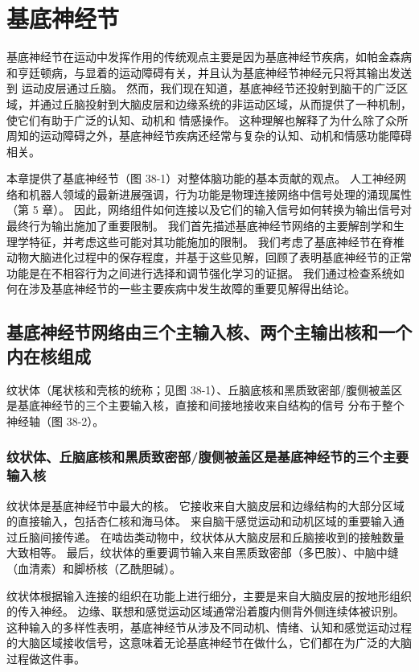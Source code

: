 \chapter{基底神经节} \label{chap:chap38}

基底神经节在运动中发挥作用的传统观点主要是因为基底神经节疾病，如帕金森病和亨廷顿病，与显着的运动障碍有关，并且认为基底神经节神经元只将其输出发送到 运动皮层通过丘脑。 然而，我们现在知道，基底神经节还投射到脑干的广泛区域，并通过丘脑投射到大脑皮层和边缘系统的非运动区域，从而提供了一种机制，使它们有助于广泛的认知、动机和 情感操作。 这种理解也解释了为什么除了众所周知的运动障碍之外，基底神经节疾病还经常与复杂的认知、动机和情感功能障碍相关。

本章提供了基底神经节（图 38-1）对整体脑功能的基本贡献的观点。 人工神经网络和机器人领域的最新进展强调，行为功能是物理连接网络中信号处理的涌现属性（第 5 章）。 因此，网络组件如何连接以及它们的输入信号如何转换为输出信号对最终行为输出施加了重要限制。 我们首先描述基底神经节网络的主要解剖学和生理学特征，并考虑这些可能对其功能施加的限制。 我们考虑了基底神经节在脊椎动物大脑进化过程中的保存程度，并基于这些见解，回顾了表明基底神经节的正常功能是在不相容行为之间进行选择和调节强化学习的证据。 我们通过检查系统如何在涉及基底神经节的一些主要疾病中发生故障的重要见解得出结论。

\section{基底神经节网络由三个主输入核、两个主输出核和一个内在核组成}
纹状体（尾状核和壳核的统称；见图 38-1）、丘脑底核和黑质致密部/腹侧被盖区是基底神经节的三个主要输入核，直接和间接地接收来自结构的信号 分布于整个神经轴（图 38-2）。

\subsection{纹状体、丘脑底核和黑质致密部/腹侧被盖区是基底神经节的三个主要输入核}
纹状体是基底神经节中最大的核。 它接收来自大脑皮层和边缘结构的大部分区域的直接输入，包括杏仁核和海马体。 来自脑干感觉运动和动机区域的重要输入通过丘脑间接传递。 在啮齿类动物中，纹状体从大脑皮层和丘脑接收到的接触数量大致相等。 最后，纹状体的重要调节输入来自黑质致密部（多巴胺）、中脑中缝（血清素）和脚桥核（乙酰胆碱）。

纹状体根据输入连接的组织在功能上进行细分，主要是来自大脑皮层的按地形组织的传入神经。 边缘、联想和感觉运动区域通常沿着腹内侧背外侧连续体被识别。 这种输入的多样性表明，基底神经节从涉及不同动机、情绪、认知和感觉运动过程的大脑区域接收信号，这意味着无论基底神经节在做什么，它们都在为广泛的大脑过程做这件事。

